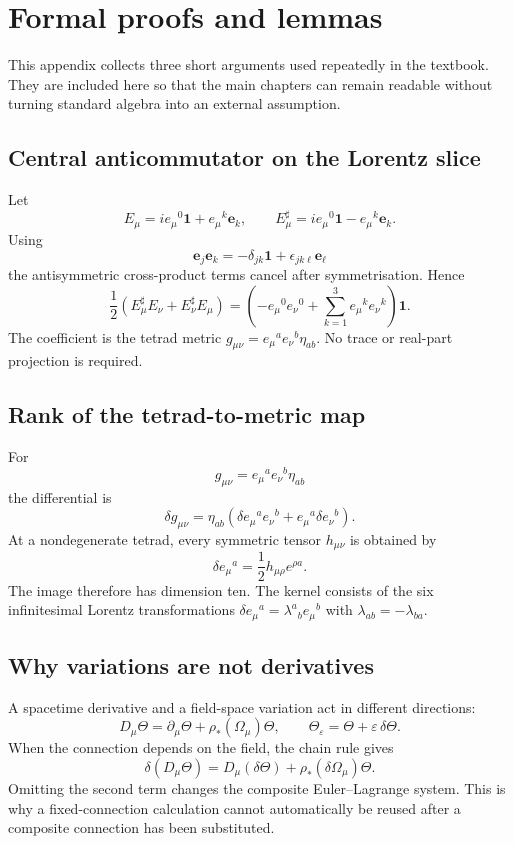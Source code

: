 
\chapter{Formal proofs and lemmas}

This appendix collects three short arguments used repeatedly in the textbook.
They are included here so that the main chapters can remain readable without
turning standard algebra into an external assumption.

\section{Central anticommutator on the Lorentz slice}
Let
\[
 E_\mu=i e_\mu{}^0\mathbf1+e_\mu{}^k\mathbf e_k,
 \qquad
 E_\mu^\sharp=i e_\mu{}^0\mathbf1-e_\mu{}^k\mathbf e_k.
\]
Using
\[
 \mathbf e_j\mathbf e_k=-\delta_{jk}\mathbf1
 +\epsilon_{jk\ell}\mathbf e_\ell
\]
the antisymmetric cross-product terms cancel after symmetrisation. Hence
\[
 \frac12\left(E_\mu^\sharp E_\nu+E_\nu^\sharp E_\mu\right)
 =\left(-e_\mu{}^0e_\nu{}^0+\sum_{k=1}^3e_\mu{}^ke_\nu{}^k\right)\mathbf1.
\]
The coefficient is the tetrad metric
$g_{\mu\nu}=e_\mu{}^ae_\nu{}^b\eta_{ab}$. No trace or real-part
projection is required.

\section{Rank of the tetrad-to-metric map}
For
\[
 g_{\mu\nu}=e_\mu{}^ae_\nu{}^b\eta_{ab}
\]
the differential is
\[
 \delta g_{\mu\nu}
 =\eta_{ab}\left(\delta e_\mu{}^a e_\nu{}^b
 +e_\mu{}^a\delta e_\nu{}^b\right).
\]
At a nondegenerate tetrad, every symmetric tensor $h_{\mu\nu}$ is obtained by
\[
 \delta e_\mu{}^a=\frac12h_{\mu\rho}e^{\rho a}.
\]
The image therefore has dimension ten. The kernel consists of the six
infinitesimal Lorentz transformations
$\delta e_\mu{}^a=\lambda^a{}_b e_\mu{}^b$ with
$\lambda_{ab}=-\lambda_{ba}$.

\section{Why variations are not derivatives}
A spacetime derivative and a field-space variation act in different
directions:
\[
 D_\mu\Theta=\partial_\mu\Theta+\rho_*(\Omega_\mu)\Theta,
 \qquad
 \Theta_\varepsilon=\Theta+\varepsilon\,\delta\Theta.
\]
When the connection depends on the field, the chain rule gives
\[
 \delta(D_\mu\Theta)
 =D_\mu(\delta\Theta)+\rho_*(\delta\Omega_\mu)\Theta.
\]
Omitting the second term changes the composite Euler--Lagrange system. This is
why a fixed-connection calculation cannot automatically be reused after a
composite connection has been substituted.
